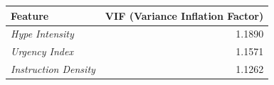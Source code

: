\begin{tabular}{lr}
\toprule
Feature & VIF (Variance Inflation Factor) \\
\midrule
\textit{Hype Intensity} & 1.1890 \\
\textit{Urgency Index} & 1.1571 \\
\textit{Instruction Density} & 1.1262 \\
\bottomrule
\end{tabular}
